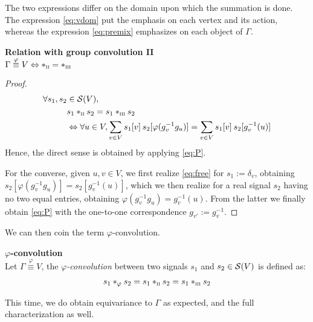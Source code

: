 The two expressions differ on the domain upon which the summation is done. The expression \eqref{eq:vdom} put the emphasis on each vertex and its action, whereas the expression \eqref{eq:premix} emphasizes on each object of $\Gamma$.

\begin{lemma}\textbf{Relation with group convolution II}\\
$\Gamma \overset{\varphi}{\equiv} V \Leftrightarrow \ast_{\II} = \ast_{\III}$
\label{lem:rel23}
\end{lemma}

\begin{proof}
\begin{align}
\forall s_1, s_2 & \in \cs(V),\nonumber\\
& s_1 \ast_{\II} s_2 = s_1 \ast_{\III} s_2 \nonumber\\
& \Leftrightarrow \forall u \in V,
\displaystyle \sum_{v \in V} s_1[v] \h{2} s_2[\varphi(g_v^{-1}g_u)] = \displaystyle \sum_{v \in V} s_1[v] \h{2} s_2[g_v^{-1}(u)] \label{eq:free}
\end{align}
Hence, the direct sense is obtained by applying \eqref{eq:P}. 

For the converse, given $u, v \in V$, we first realize \eqref{eq:free} for $s_1 := \delta_v$, obtaining $s_2[\varphi(g_v^{-1}g_u)] = s_2[g_v^{-1}(u)]$, which we then realize for a real signal $s_2$ having no two equal entries, obtaining $\varphi(g_v^{-1}g_u) = g_v^{-1}(u)$. From the latter we finally obtain \eqref{eq:P} with the one-to-one correspondence $g_{v'} := g_v^{-1}$.
\end{proof}

We can then coin the term $\varphi$-convolution.

\begin{definition}\textbf{$\varphi$-convolution}\\
Let $\Gamma \overset{\varphi}{\equiv} V$, the \emph{$\varphi$-convolution} between two signals $s_1$ and $s_2 \in \cs(V)$ is defined as:
\begin{align*}
s_1 \ast_{\varphi} s_2 = s_1 \ast_{\II} s_2 = s_1 \ast_{\III} s_2
\end{align*}
\label{def:convv}
\end{definition}

This time, we do obtain equivariance to $\Gamma$ as expected, and the full characterization as well.

